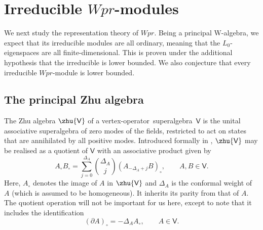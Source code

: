 \documentclass[10pt,a4paper]{amsart}
\numberwithin{equation}{section}
\newcommand{\pd}{\partial} %
\newcommand{\kk}{\mathsf{k}} %
\newcommand{\VOA}[1]{\mathsf{#1}} %
\newcommand{\uwalg}[2]{\VOA{W}^{#1}_{\mathrm{#2}}} %
\newcommand{\upr}[1][\kk]{\uwalg{#1}{pr}} %
\newcommand{\zh}[1]{#1_{\circ}} %
\newcommand{\fdim}{finite-dimensional}
\newcommand{\vo}{vertex-operator}
\newcommand{\svoa}{\vo\ superalgebra}
\def\boldsymbol#1{#1}
\def\smash#1{#1}
\def\upr{Wpr}
\begin{document}
\section[Irreducible upr-modules]{Irreducible \smash{$\boldsymbol{\upr}$}-modules} \label{sec:reps}

We next study the representation theory of \smash{$\upr$}.
Being a principal W-algebra, we expect that its irreducible modules are all ordinary, meaning that the $L_0$-eigenspaces are all \fdim.
This is proven under the additional hypothesis that the irreducible is lower bounded.
We also conjecture that every irreducible \smash{$\upr$}-module is lower bounded.

\subsection{The principal Zhu algebra} \label{sec:zhu}

The Zhu algebra $\zhu{\VOA{V}}$ of a \svoa\ $\VOA{V}$ is the unital associative superalgebra of zero modes of the fields, restricted to act on states that are annihilated by all positive modes.
Introduced formally in \cite{KacVer93,ZhuMod96}, $\zhu{\VOA{V}}$ may be realised as a quotient of $\VOA{V}$ with an associative product given by
\begin{equation} \label{eq:zhudef}
	\zh{A} \zh{B} = \sum_{j=0}^{\Delta_A} \binom{\Delta_A}{j} \zh{(A_{-\Delta_A+j}B)}, \qquad A,B \in \VOA{V}.
\end{equation}
Here, $\zh{A}$ denotes the image of $A$ in $\zhu{\VOA{V}}$ and $\Delta_A$ is the conformal weight of $A$ (which is assumed to be homogeneous).
It inherits its parity from that of $A$.
The quotient operation will not be important for us here, except to note that it includes the identification
\begin{equation} \label{eq:zhuid}
	\zh{(\pd A)} = -\Delta_A \zh{A}, \qquad A \in \VOA{V}.
\end{equation}
\end{document}
